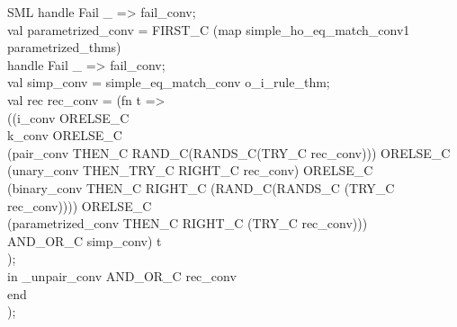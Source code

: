 \documentclass[11pt,a4paper]{article}
\begin{document}
\begin{GFT}{SML}
\+			handle Fail \_ => fail\_conv;\\
\+		val parametrized\_conv = FIRST\_C (map simple\_ho\_eq\_match\_conv1 parametrized\_thms)\\
\+			handle Fail \_ => fail\_conv;\\
\+		val simp\_conv = simple\_eq\_match\_conv o\_i\_rule\_thm;\\
\+		val rec rec\_conv = (fn t =>\\
\+			((i\_conv ORELSE\_C\\
\+			k\_conv ORELSE\_C\\
\+			(pair\_conv THEN\_C RAND\_C(RANDS\_C(TRY\_C rec\_conv))) ORELSE\_C\\
\+			(unary\_conv THEN\_TRY\_C RIGHT\_C rec\_conv) ORELSE\_C\\
\+			(binary\_conv THEN\_C RIGHT\_C (RAND\_C(RANDS\_C (TRY\_C rec\_conv)))) ORELSE\_C\\
\+			(parametrized\_conv THEN\_C RIGHT\_C (TRY\_C rec\_conv)))\\
\+				AND\_OR\_C simp\_conv) t\\
\+		);\\
\+	in	\PrMM{}\_unpair\_conv AND\_OR\_C rec\_conv\\
\+	end\\
\+);\\
\end{GFT}
\end{document}
